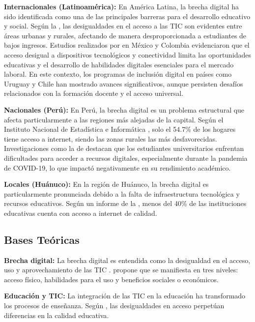 \documentclass[12pt, a4paper]{article}
\begin{document}
\textbf{Internacionales (Latinoamérica):} En América Latina, la brecha digital ha sido identificada como una de las principales barreras para el desarrollo educativo y social. Según la \textcite{cepal2020}, las desigualdades en el acceso a las TIC son evidentes entre áreas urbanas y rurales, afectando de manera desproporcionada a estudiantes de bajos ingresos. Estudios realizados por \textcite{sanchez2021} en México y Colombia evidenciaron que el acceso desigual a dispositivos tecnológicos y conectividad limita las oportunidades educativas y el desarrollo de habilidades digitales esenciales para el mercado laboral. En este contexto, los programas de inclusión digital en países como Uruguay y Chile han mostrado avances significativos, aunque persisten desafíos relacionados con la formación docente y el acceso universal.


\textbf{Nacionales (Perú):} En Perú, la brecha digital es un problema estructural que afecta particularmente a las regiones más alejadas de la capital. Según el Instituto Nacional de Estadística e Informática \parencite{inei2022}, solo el 54.7\% de los hogares tiene acceso a internet, siendo las zonas rurales las más desfavorecidas. Investigaciones como la de \textcite{vasquez2021} destacan que los estudiantes universitarios enfrentan dificultades para acceder a recursos digitales, especialmente durante la pandemia de COVID-19, lo que impactó negativamente en su rendimiento académico.

\textbf{Locales (Huánuco):} En la región de Huánuco, la brecha digital es particularmente pronunciada debido a la falta de infraestructura tecnológica y recursos educativos. Según un informe de la \textcite{dreh2023}, menos del 40\% de las instituciones educativas cuenta con acceso a internet de calidad.

\subsection{Bases Teóricas}

\textbf{Brecha digital:} La brecha digital es entendida como la desigualdad en el acceso, uso y aprovechamiento de las TIC \parencite{unesco2019}. \textcite{vandijk2020} propone que se manifiesta en tres niveles: acceso físico, habilidades para el uso y beneficios sociales o económicos.

\textbf{Educación y TIC:} La integración de las TIC en la educación ha transformado los procesos de enseñanza. Según \textcite{coll2021}, las desigualdades en acceso perpetúan diferencias en la calidad educativa.
\end{document}
